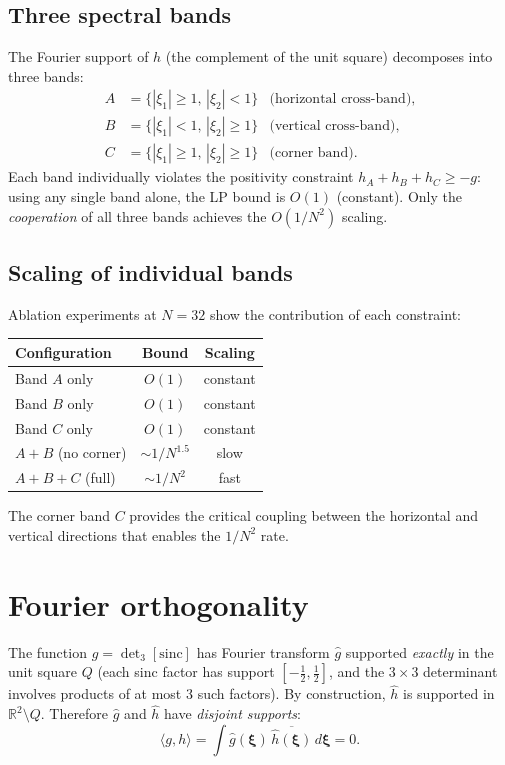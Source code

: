 \documentclass[11pt]{article}
\begin{document}
\subsection{Three spectral bands}

The Fourier support of $h$ (the complement of the unit square)
decomposes into three bands:
\begin{align}
A &= \{|\xi_1| \geq 1,\, |\xi_2| < 1\} & \text{(horizontal cross-band)}, \\
B &= \{|\xi_1| < 1,\, |\xi_2| \geq 1\} & \text{(vertical cross-band)}, \\
C &= \{|\xi_1| \geq 1,\, |\xi_2| \geq 1\} & \text{(corner band)}.
\end{align}
Each band individually violates the positivity constraint
$h_A + h_B + h_C \geq -g$: using any single band alone, the LP
bound is $O(1)$ (constant). Only the \emph{cooperation} of all three
bands achieves the $O(1/N^2)$ scaling.

\subsection{Scaling of individual bands}

Ablation experiments at $N = 32$ show the contribution of each
constraint:
\begin{center}
\begin{tabular}{lcc}
\toprule
Configuration & Bound & Scaling \\
\midrule
Band $A$ only & $O(1)$ & constant \\
Band $B$ only & $O(1)$ & constant \\
Band $C$ only & $O(1)$ & constant \\
$A + B$ (no corner) & $\sim 1/N^{1.5}$ & slow \\
$A + B + C$ (full) & $\sim 1/N^2$ & fast \\
\bottomrule
\end{tabular}
\end{center}

The corner band $C$ provides the critical coupling between the
horizontal and vertical directions that enables the $1/N^2$ rate.


\section{Fourier orthogonality}

The function $g = \det_3[\mathrm{sinc}]$ has Fourier transform
$\hat{g}$ supported \emph{exactly} in the unit square $Q$ (each
sinc factor has support $[-\tfrac{1}{2}, \tfrac{1}{2}]$, and the
$3 \times 3$ determinant involves products of at most 3 such factors).
By construction, $\hat{h}$ is supported in $\mathbb{R}^2 \setminus Q$.
Therefore $\hat{g}$ and $\hat{h}$ have \emph{disjoint supports}:
\begin{equation}
\langle g, h \rangle = \int \hat{g}(\boldsymbol{\xi})\,
\overline{\hat{h}(\boldsymbol{\xi})}\, d\boldsymbol{\xi} = 0.
\end{equation}
\end{document}
